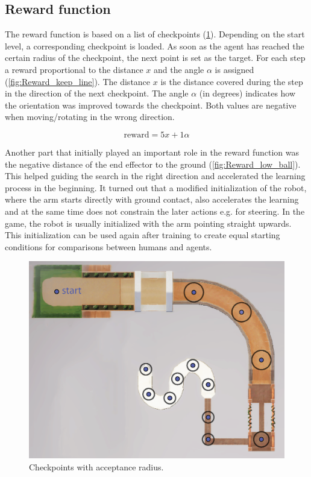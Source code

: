 \documentclass[conference]{IEEEtran}
\begin{document}
\subsection{Reward function}
The reward function is based on a list of checkpoints (\figurename  \ref{fig:Checkpoint_map}). Depending on the start level, a corresponding checkpoint is loaded. As soon as the agent has reached the certain radius of the checkpoint, the next point is set as the target.
For each step a reward proportional to the distance $x$ and the angle $\alpha$ is assigned (\figurename  \ref{fig:Reward_keep_line}). The distance $x$ is the distance covered during the step in the direction of the next checkpoint. The angle $\alpha$ (in degrees) indicates how the orientation was improved towards the checkpoint. Both values are negative when moving/rotating in the wrong direction.


\begin{equation}
\text{reward} = 5x + 1\alpha
\end{equation}

Another part that initially played an important role in the reward function was the negative distance of the end effector to the ground (\figurename  \ref{fig:Reward_low_ball}). This helped guiding the search in the right direction and accelerated the learning process in the beginning. It turned out that a modified initialization of the robot, where the arm starts directly with ground contact, also accelerates the learning and at the same time does not constrain the later actions e.g. for steering. In the game, the robot is usually initialized with the arm pointing straight upwards. This initialization can be used again after training to create equal starting conditions for comparisons between humans and agents.


\begin{figure}[!t]
  \centering
  \includegraphics[width=1\linewidth]{images/RoboSkate_Map.eps}
  \caption{Checkpoints with acceptance radius.}
\label{fig:Checkpoint_map}
\end{figure}
\end{document}
